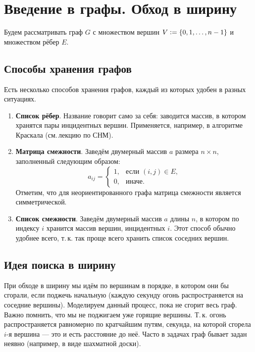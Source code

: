 \section{Введение в графы. Обход в ширину}

Будем рассматривать граф $G$ с множеством вершин $V \vcentcolon = \{0, 1, \ldots, n \hm - 1\}$ и множеством рёбер $E$. 

\subsection{Способы хранения графов}

Есть несколько способов хранения графов, каждый из которых удобен в разных ситуациях.

\begin{enumerate}
    \item \textbf{Список рёбер}. Название говорит само за себя: заводится массив, в котором хранятся пары инцидентных вершин. Применяется, например, в алгоритме Краскала (см.\,лекцию по СНМ).
    \item \textbf{Матрица смежности}. Заведём двумерный массив $a$ размера $n \times n$, заполненный следующим образом:
    \[
    a_{ij} =
    \begin{cases}
        1,&\text{если $(i, j) \in E$},\\
        0,&\text{иначе}.
    \end{cases}
    \]
    Отметим, что для неориентированного графа матрица смежности является симметрической.
    \item \textbf{Список смежности}. Заведём двумерный массив $a$ длины $n$, в котором по индексу $i$ хранится массив вершин, инцидентных $i$. Этот способ обычно удобнее всего, т.\,к. так проще всего хранить список соседних вершин.
\end{enumerate}

\subsection{Идея поиска в ширину}

При обходе в ширину мы идём по вершинам в порядке, в котором они бы сгорали, если поджечь начальную (каждую секунду огонь распространяется на соседние вершины). Моделируем данный процесс, пока не сгорит весь граф. Важно помнить, что мы не поджигаем уже горящие вершины. Т.\,к. огонь распространяется равномерно по кратчайшим путям, секунда, на которой сгорела $i$-я вершина --- это и есть расстояние до неё. Часто в задачах граф бывает задан неявно (например, в виде шахматной доски).

